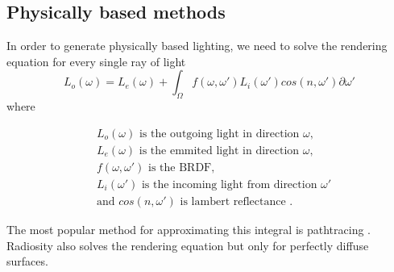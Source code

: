 \documentclass{ACGSeminar}
\begin{document}
	\subsection{Physically based methods}
	In order to generate physically based lighting, we need to solve the rendering equation for every single ray of light
	$$ L_o(\omega) = L_e(\omega) + \int_\Omega f(\omega, \omega')L_i(\omega')cos(n, \omega') \partial \omega' $$
	where %
	\begin{center}
		\begin{align*}
			&L_o(\omega) \text{ is the outgoing light in direction } \omega\text{,}\\
			&L_e(\omega) \text{ is the emmited light in direction } \omega\text{,}\\
			&f(\omega, \omega') \text{ is the BRDF} \text{,}\\
			&L_i(\omega') \text{ is the incoming light from direction } \omega'\\
			&\text{and } cos(n, \omega') \text{ is lambert reflectance}  \text{ .}
		\end{align*}
	\end{center}
	The most popular method for approximating this integral is pathtracing \cite{P2PATH}. Radiosity also solves the rendering equation but only for perfectly diffuse surfaces. %
\end{document}
